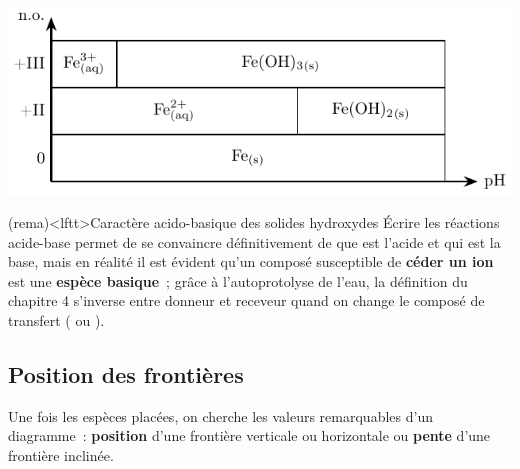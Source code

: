 \documentclass[../../main/main.tex]{subfiles}
\begin{document}
\begin{tcb*}[breakable]
\begin{enumerate}[label=\sqenumi]
\begin{center}
{        }{
        \includegraphics[width=.8\linewidth]{esit_fer}
        }
      \end{center}
  \end{enumerate}
\end{tcb*}

\begin{tcb*}(rema)<lftt>{Caractère acido-basique des solides hydroxydes}
  Écrire les réactions acide-base permet de se convaincre définitivement de que
  est l'acide et qui est la base, mais en réalité il est évident qu'un composé
  susceptible de \textbf{céder un ion } est une \textbf{espèce
  basique}~; grâce à l'autoprotolyse de l'eau, la définition du chapitre 4
  s'inverse entre donneur et receveur quand on change le composé de transfert
  ( ou ).
\end{tcb*}

\subsection{Position des frontières}
Une fois les espèces placées, on cherche les valeurs remarquables d'un
diagramme~: \textbf{position} d'une frontière verticale ou horizontale ou
\textbf{pente} d'une frontière inclinée.
\end{document}

